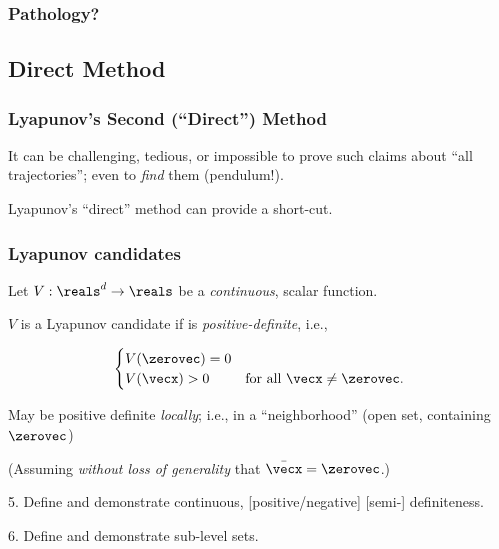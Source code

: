 \documentclass[12pt]{beamer}
\begin{document}
\begin{frame}
\frametitle{Pathology?}
\end{frame}



\subsection{Direct Method}

\begin{frame}
\frametitle{Lyapunov's Second (``Direct'') Method}

\begin{itemize}
\vitem
It can be challenging, tedious, or impossible
to prove such claims about ``all trajectories'';
even to \emph{find} them (pendulum!).

\vitem
Lyapunov's ``direct'' method can provide a short-cut.

\end{itemize}

\vfill\null
\end{frame}




\begin{frame}
\frametitle{Lyapunov candidates}

\begin{itemize}

\vitem
Let $V : \reals^d \to \reals$ be a \emph{continuous}, scalar function.

\vitem
$V$ is a Lyapunov candidate if is \emph{positive-definite}, i.e.,

\[
\begin{cases}
	V(\zerovec) = 0 &\\
	V(\vecx) > 0 & \text{for all $\vecx \neq \zerovec$}.
\end{cases}
\]

\vitem
May be positive definite \emph{locally}; i.e., in a ``neighborhood''
(open set, containing $\zerovec$)

\vitem
(Assuming \emph{without loss of generality} that $\bar{\vecx} = \zerovec$.)

\end{itemize}
\vfill\null
\end{frame}




\begin{frame}

5. Define and demonstrate continuous, [positive/negative] [semi-] definiteness.

6. Define and demonstrate sub-level sets.

\end{frame}
\end{document}
